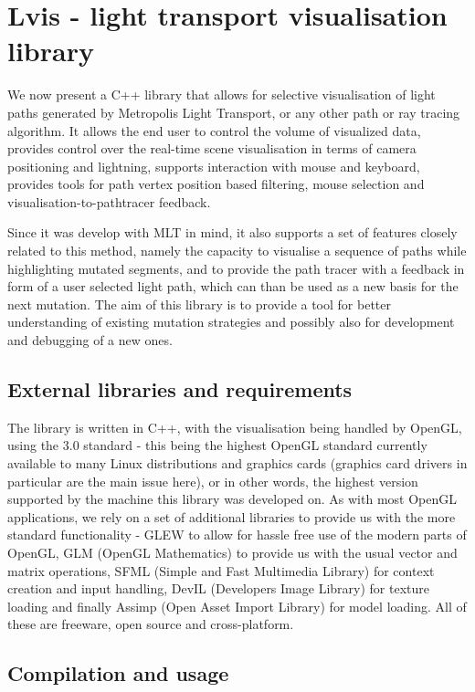 \chapter{Lvis - light transport visualisation library}\label{chap:vis}

We now present a C++ library that allows for selective visualisation of light paths generated by Metropolis Light Transport, or any other path or ray tracing algorithm. It allows the end user to control the volume of visualized data, provides control over the real-time scene visualisation in terms of camera positioning and lightning, supports interaction with mouse and keyboard, provides tools for path vertex position based filtering, mouse selection and visualisation-to-pathtracer feedback.

Since it was develop with MLT in mind, it also supports a set of features closely related to this method, namely the capacity to visualise a sequence of paths while highlighting mutated segments, and to provide the path tracer with a feedback in form of a user selected light path, which can than be used as a new basis for the next mutation. The aim of this library is to provide a tool for better understanding of existing mutation strategies and possibly also for development and debugging of a new ones.

\section{External libraries and requirements}

The library is written in C++, with the visualisation being handled by OpenGL, using the 3.0 standard - this being the highest OpenGL standard currently available to many Linux distributions and graphics cards (graphics card drivers in particular are the main issue here), or in other words, the highest version supported by the machine this library was developed on. As with most OpenGL applications, we rely on a set of additional libraries to provide us with the more standard functionality - GLEW to allow for hassle free use of the modern parts of OpenGL, GLM (OpenGL Mathematics) to provide us with the usual vector and matrix operations, SFML (Simple and Fast Multimedia Library) for context creation and input handling, DevIL (Developers Image Library) for texture loading and finally Assimp (Open Asset Import Library) for model loading. All of these are freeware, open source and cross-platform.

\section{Compilation and usage}


